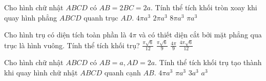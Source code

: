 \begin{ex}%
	Cho hình chữ nhật $ABCD$ có $AB=2BC=2a$. Tính thể tích khối tròn xoay khi quay hình phẳng $ABCD$ quanh trục $AD.$
	\choice
	{\True $4\pi a^3$}
	{$2\pi a^3$}
	{$8\pi a^3$}
	{$\pi a^3$}
\end{ex}

\begin{ex}%
	Cho hình trụ có diện tích toàn phần là $4\pi$ và có thiết diện cắt bởi mặt phẳng qua trục là hình vuông. Tính thể tích khối trụ?
	\choice
	{$\frac{\pi \sqrt{6}}{12}$}
	{$\frac{\pi \sqrt{6}}{9}$}
	{$\frac{4\pi}{9}$}
	{\True $\frac{4\pi \sqrt{6}}{12}$}
\end{ex}

\begin{ex}%
	Cho hình chữ nhật $ABCD$ có $AB=a, AD=2a$. Tính thể tích khối trụ tạo thành khi quay hình chữ nhật $ABCD$ quanh cạnh $AB.$
	\choice
	{\True $4\pi a^3$}
	{$\pi a^3$}
	{$3 a^3$}
	{$a^3$}
\end{ex}

